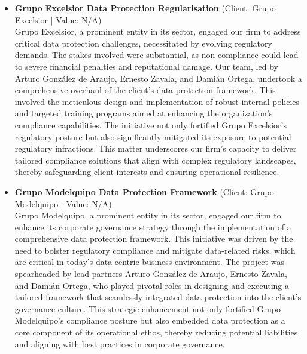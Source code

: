 \documentclass[11pt]{article}
\begin{document}
\begin{itemize}
This initiative not only reinforced Hotel Riazor's commitment to data privacy but also positioned the hotel to better navigate the evolving regulatory landscape, ensuring compliance and enhancing its reputation for data security. The firm's role was pivotal in transforming the hotel's data protection practices, demonstrating its capability to deliver tailored solutions in complex regulatory environments.
\item \textbf{Grupo Excelsior Data Protection Regularisation} (Client: Grupo Excelsior | Value: N/A)\\ Grupo Excelsior, a prominent entity in its sector, engaged our firm to address critical data protection challenges, necessitated by evolving regulatory demands. The stakes involved were substantial, as non-compliance could lead to severe financial penalties and reputational damage. Our team, led by Arturo González de Araujo, Ernesto Zavala, and Damián Ortega, undertook a comprehensive overhaul of the client's data protection framework. This involved the meticulous design and implementation of robust internal policies and targeted training programs aimed at enhancing the organization's compliance capabilities. The initiative not only fortified Grupo Excelsior's regulatory posture but also significantly mitigated its exposure to potential regulatory infractions. This matter underscores our firm's capacity to deliver tailored compliance solutions that align with complex regulatory landscapes, thereby safeguarding client interests and ensuring operational resilience.
\item \textbf{Grupo Modelquipo Data Protection Framework} (Client: Grupo Modelquipo | Value: N/A)\\ Grupo Modelquipo, a prominent entity in its sector, engaged our firm to enhance its corporate governance strategy through the implementation of a comprehensive data protection framework. This initiative was driven by the need to bolster regulatory compliance and mitigate data-related risks, which are critical in today's data-centric business environment. The project was spearheaded by lead partners Arturo González de Araujo, Ernesto Zavala, and Damián Ortega, who played pivotal roles in designing and executing a tailored framework that seamlessly integrated data protection into the client's governance culture. This strategic enhancement not only fortified Grupo Modelquipo's compliance posture but also embedded data protection as a core component of its operational ethos, thereby reducing potential liabilities and aligning with best practices in corporate governance.

\end{itemize}
\end{document}
